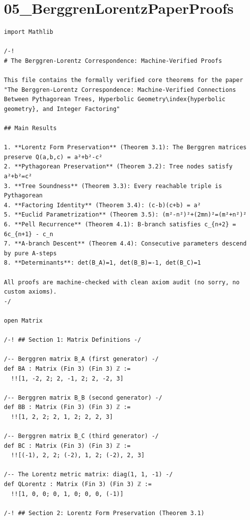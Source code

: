 \documentclass[11pt,openany]{book}
\theoremstyle{definition}
\theoremstyle{plain}
\theoremstyle{remark}
\begin{document}
\clearpage

\section*{05\_BerggrenLorentzPaperProofs}

\begin{lstlisting}[style=lean]
import Mathlib

/-!
# The Berggren-Lorentz Correspondence: Machine-Verified Proofs

This file contains the formally verified core theorems for the paper
"The Berggren-Lorentz Correspondence: Machine-Verified Connections
Between Pythagorean Trees, Hyperbolic Geometry\index{hyperbolic geometry}, and Integer Factoring"

## Main Results

1. **Lorentz Form Preservation** (Theorem 3.1): The Berggren matrices preserve Q(a,b,c) = a²+b²-c²
2. **Pythagorean Preservation** (Theorem 3.2): Tree nodes satisfy a²+b²=c²
3. **Tree Soundness** (Theorem 3.3): Every reachable triple is Pythagorean
4. **Factoring Identity** (Theorem 3.4): (c-b)(c+b) = a²
5. **Euclid Parametrization** (Theorem 3.5): (m²-n²)²+(2mn)²=(m²+n²)²
6. **Pell Recurrence** (Theorem 4.1): B-branch satisfies c_{n+2} = 6c_{n+1} - c_n
7. **A-branch Descent** (Theorem 4.4): Consecutive parameters descend by pure A-steps
8. **Determinants**: det(B_A)=1, det(B_B)=-1, det(B_C)=1

All proofs are machine-checked with clean axiom audit (no sorry, no custom axioms).
-/

open Matrix

/-! ## Section 1: Matrix Definitions -/

/-- Berggren matrix B_A (first generator) -/
def BA : Matrix (Fin 3) (Fin 3) ℤ :=
  !![1, -2, 2; 2, -1, 2; 2, -2, 3]

/-- Berggren matrix B_B (second generator) -/
def BB : Matrix (Fin 3) (Fin 3) ℤ :=
  !![1, 2, 2; 2, 1, 2; 2, 2, 3]

/-- Berggren matrix B_C (third generator) -/
def BC : Matrix (Fin 3) (Fin 3) ℤ :=
  !![(-1), 2, 2; (-2), 1, 2; (-2), 2, 3]

/-- The Lorentz metric matrix: diag(1, 1, -1) -/
def QLorentz : Matrix (Fin 3) (Fin 3) ℤ :=
  !![1, 0, 0; 0, 1, 0; 0, 0, (-1)]

/-! ## Section 2: Lorentz Form Preservation (Theorem 3.1)


\end{lstlisting}
\end{document}

